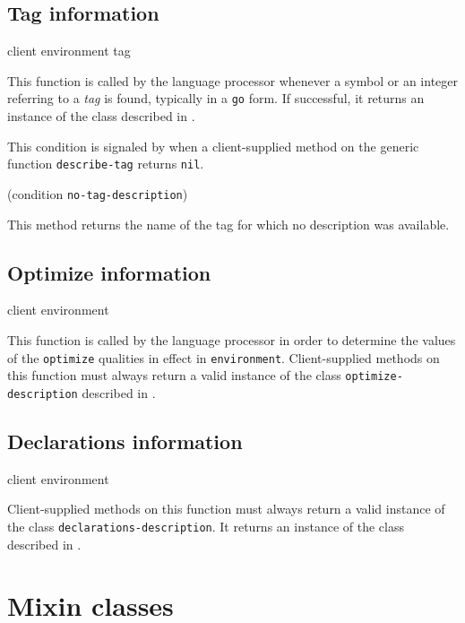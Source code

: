 \subsection{Tag information}

{\footnotesize
{} {client environment tag}
}

This function is called by the language processor whenever a symbol or
an integer referring to a \emph{tag} is found, typically in a
\texttt{go} form.  If successful, it returns an instance of the
class described in .

{\footnotesize
{}
}

This condition is signaled by \sysname{} when a client-supplied method
on the generic function \texttt{describe-tag} returns \texttt{nil}.

{\footnotesize
{} {(condition {\tt no-tag-description})}
}

This method returns the name of the tag for which no description was
available.

\subsection{Optimize information}

{\footnotesize
{} {client environment}
}

This function is called by the language processor in order to
determine the values of the \texttt{optimize} qualities in effect in
\texttt{environment}.  Client-supplied methods on this function must
always return a valid instance of the class
\texttt{optimize-description} described in
.


\subsection{Declarations information}

{\footnotesize
{} {client environment}
}

Client-supplied methods on this function must always return a valid
instance of the class \texttt{declarations-description}.  It returns
an instance of the class described in
.


\section{Mixin classes}

